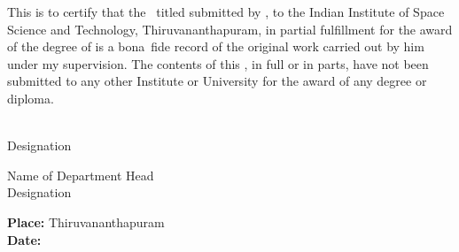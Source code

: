 This is to certify that the \Doctype\ titled \textbf{\textit{\Title}} submitted by
{\bf\Author}, to the Indian Institute of Space Science and Technology,
Thiruvananthapuram, in partial fulfillment for the award of the degree of
{\bf\Degreetext} is a
bona~fide record of the original work carried out by him under my supervision. The
contents of this \Doctype, in full or in parts, have not been submitted to any other
Institute or University for the award of any degree or diploma.

\vspace{35mm}
\noindent
\begin{minipage}{0.5\textwidth}
    \Advisor\\
    Designation
\end{minipage}
\hspace{2cm}
    \begin{minipage}{0.5\textwidth}
    Name of Department Head\\
    Designation
\end{minipage}

\vspace{30mm}
\noindent
\textbf{Place: }Thiruvananthapuram\\
\textbf{Date: \ }\Date
